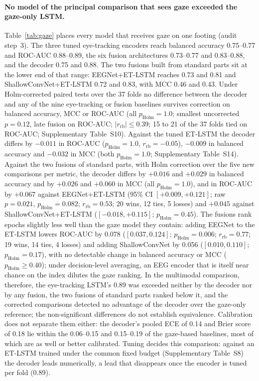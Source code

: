 \documentclass[pdflatex,sn-basic,Numbered,twocolumn,iicol]{sn-jnl}
\theoremstyle{thmstyleone}%
\theoremstyle{thmstyletwo}%
\theoremstyle{thmstylethree}%
\begin{document}
\paragraph{No model of the principal comparison that sees gaze exceeded the gaze-only LSTM.} Table~\ref{tab:gaze} places every model that receives gaze on one footing (audit step~3). The three tuned eye-tracking encoders reach balanced accuracy 0.75--0.77 and ROC-AUC 0.88--0.89, the six fusion architectures 0.73--0.77 and 0.83--0.88, and the decoder 0.75 and 0.88. The two fusions built from standard parts sit at the lower end of that range: EEGNet+ET-LSTM reaches 0.73 and 0.81 and ShallowConvNet+ET-LSTM 0.72 and 0.83, with MCC 0.46 and 0.43. Under Holm-corrected paired tests over the 37 folds no difference between the decoder and any of the nine eye-tracking or fusion baselines survives correction on balanced accuracy, MCC or ROC-AUC (all $p_{\mathrm{Holm}}=1.0$; smallest uncorrected $p=0.12$, late fusion on ROC-AUC; $|r_{\mathrm{rb}}|\le0.39$; 15 to 21 of the 37 folds tied on ROC-AUC; Supplementary Table~S10). Against the tuned ET-LSTM the decoder differs by $-0.011$ in ROC-AUC ($p_{\mathrm{Holm}}=1.0$, $r_{\mathrm{rb}}=-0.05$), $-0.009$ in balanced accuracy and $-0.032$ in MCC (both $p_{\mathrm{Holm}}=1.0$; Supplementary Table~S14). Against the two fusions of standard parts, with Holm correction over the five new comparisons per metric, the decoder differs by $+0.016$ and $+0.029$ in balanced accuracy and by $+0.026$ and $+0.060$ in MCC (all $p_{\mathrm{Holm}}=1.0$), and in ROC-AUC by $+0.067$ against EEGNet+ET-LSTM (95\% CI $[+0.009, +0.121]$; raw $p=0.021$, $p_{\mathrm{Holm}}=0.082$; $r_{\mathrm{rb}}=0.53$; 20 wins, 12 ties, 5 losses) and $+0.045$ against ShallowConvNet+ET-LSTM ($[-0.018, +0.115]$; $p_{\mathrm{Holm}}=0.45$). The fusions rank epochs slightly less well than the gaze model they contain: adding EEGNet to the ET-LSTM lowers ROC-AUC by 0.078 ($[0.037, 0.124]$; $p_{\mathrm{Holm}}=0.006$; $r_{\mathrm{rb}}=0.77$; 19 wins, 14 ties, 4 losses) and adding ShallowConvNet by 0.056 ($[0.010, 0.110]$; $p_{\mathrm{Holm}}=0.17$), with no detectable change in balanced accuracy or MCC ($p_{\mathrm{Holm}}\ge0.40$); under decision-level averaging, an EEG encoder that is itself near chance on the index dilutes the gaze ranking. In the multimodal comparison, therefore, the eye-tracking LSTM's 0.89 was exceeded neither by the decoder nor by any fusion, the two fusions of standard parts ranked below it, and the corrected comparisons detected no advantage of the decoder over the gaze-only reference; the non-significant differences do not establish equivalence. Calibration does not separate them either: the decoder's pooled ECE of 0.14 and Brier score of 0.18 lie within the 0.06--0.15 and 0.15--0.19 of the gaze-based baselines, most of which are as well or better calibrated. Tuning decides this comparison: against an ET-LSTM trained under the common fixed budget (Supplementary Table~S8) the decoder leads numerically, a lead that disappears once the encoder is tuned per fold (0.89).
\end{document}
